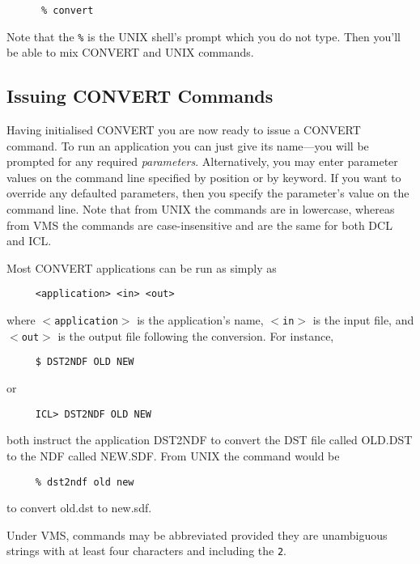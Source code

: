 \small
\begin{verbatim}
      % convert
\end{verbatim}
\normalsize 
Note that the {\tt \%} is the UNIX shell's prompt which you do not type.
Then you'll be able to mix {\footnotesize CONVERT} and UNIX commands.

\subsection{Issuing CONVERT Commands}

Having initialised {\footnotesize CONVERT} you are now ready to issue a
{\footnotesize CONVERT} command. To run an application you can just give
its name---you will be prompted for any required {\em parameters}. 
Alternatively, you may enter parameter values on the command line
specified by position or by keyword.  If you want to override any
defaulted parameters, then you specify the parameter's value on the
command line.  Note that from UNIX the commands are in lowercase, whereas
from VMS the commands are case-insensitive and are the same for both
{\footnotesize DCL} and {\footnotesize ICL}.

Most {\footnotesize CONVERT} applications can be run as simply as 

\small
\begin{verbatim}
     <application> <in> <out>
\end{verbatim}
\normalsize
where {\tt $<$application$>$} is the application's name, {\tt $<$in$>$}
is the input file, and {\tt $<$out$>$} is the output
file following the conversion.  For instance, 

\small
\begin{verbatim}
     $ DST2NDF OLD NEW
\end{verbatim}
\normalsize
or

\small
\begin{verbatim}
     ICL> DST2NDF OLD NEW
\end{verbatim}
\normalsize
both instruct the application DST2NDF to convert the DST file called
OLD.DST to the NDF called NEW.SDF.  From UNIX the command would be

\small
\begin{verbatim}
     % dst2ndf old new
\end{verbatim}
\normalsize
to convert old.dst to new.sdf.

Under VMS, commands may be abbreviated provided they are unambiguous
strings with at least four characters and including the {\tt 2}. 

